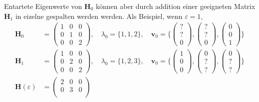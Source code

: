 Entartete Eigenwerte von $\bm H_0$ können aber durch addition einer geeigneten Matrix $\bm H_1$ in eizelne gespalten werden werden.
Als Beispiel, wenn $\varepsilon = 1$, 
\begin{align}
    \bm H_0 &= 
    \begin{pmatrix}
        1 & 0 & 0\\
        0 & 1 & 0\\
        0 & 0 & 2
    \end{pmatrix},
    \quad
    \lambda_0 = \{1, 1, 2\},
    \quad
    \bm v_0 = \{
    \begin{pmatrix}
        ?\\
        ?\\
        0
    \end{pmatrix},
    \begin{pmatrix}
        ?\\
        ?\\
        0
    \end{pmatrix},
    \begin{pmatrix}
        0\\
        0\\
        1
    \end{pmatrix}
    \}
    \\
    \bm H_1 &= 
    \begin{pmatrix}
        1 & 0 & 0\\
        0 & 2 & 0\\
        0 & 0 & 2
    \end{pmatrix},
    \quad
    \lambda_0 = \{1, 2, 3\},
    \quad
    \bm v_0 = \{
    \begin{pmatrix}
        1\\
        0\\
        0
    \end{pmatrix},
    \begin{pmatrix}
        0\\
        ?\\
        ?
    \end{pmatrix},
    \begin{pmatrix}
        0\\
        ?\\
        ?
    \end{pmatrix}
    \}
    \\
    \bm H(\varepsilon) &= 
    \begin{pmatrix}
        2 & 0 & 0\\
        0 & 3 & 0\\

\end{pmatrix}
\end{align}
